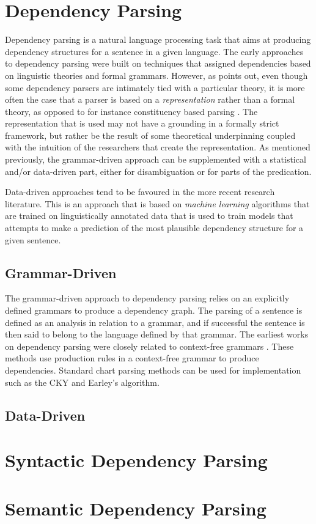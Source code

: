 \section{Dependency Parsing}
\label{parsing}

Dependency parsing is a natural language processing task that aims at producing dependency structures for a sentence in a given language. The early approaches to dependency parsing were built on techniques that assigned dependencies based on linguistic theories and formal grammars. However, as \citeauthor{Niv:05} points out, even though some dependency parsers are intimately tied with a particular theory, it is more often the case that a parser is based on a \textit{representation} rather than a formal theory, as opposed to for instance constituency based parsing \cite{Niv:05}. The representation that is used may not have a grounding in a formally strict framework, but rather be the result of some theoretical underpinning coupled with the intuition of the researchers that create the representation. As mentioned previously, the grammar-driven approach can be supplemented with a statistical and/or data-driven part, either for disambiguation or for parts of the predication.

Data-driven approaches tend to be favoured in the more recent research literature. This is an approach that is based on \textit{machine learning} algorithms that are trained on linguistically annotated data that is used to train models that attempts to make a prediction of the most plausible dependency structure for a given sentence.

\subsection{Grammar-Driven}
\label{grammar-driven}

The grammar-driven approach to dependency parsing relies on an explicitly defined grammars to produce a dependency graph. The parsing of a sentence is defined as an analysis in relation to a grammar, and if successful the sentence is then said to belong to the language defined by that grammar. The earliest works on dependency parsing were closely related to context-free grammars \cite{KublerEtAl:09}. These methods use production rules in a context-free grammar to produce dependencies. Standard chart parsing methods can be used for implementation such as the CKY and Earley's algorithm.

\subsection{Data-Driven}

\section{Syntactic Dependency Parsing}

\section{Semantic Dependency Parsing}